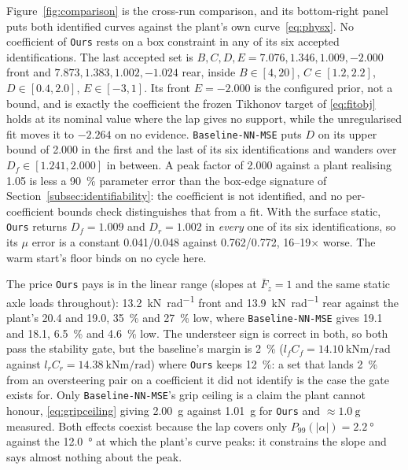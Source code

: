 Figure~\ref{fig:comparison} is the cross-run comparison, and its bottom-right
panel puts both identified curves against the plant's own
curve~\eqref{eq:physx}. No coefficient of \texttt{Ours} rests on a box
constraint in any of its six accepted identifications. The last accepted set is
$B,C,D,E=\num{7.076},\num{1.346},\num{1.009},\num{-2.000}$ front and
$\num{7.873},\num{1.383},\num{1.002},\num{-1.024}$ rear, inside
$B\in[4,20]$, $C\in[1.2,2.2]$, $D\in[0.4,2.0]$, $E\in[-3,1]$. Its front
$E=\num{-2.000}$ is the configured prior, not a bound, and is exactly the
coefficient the frozen Tikhonov target of \eqref{eq:fitobj} holds at its
nominal value where the lap gives no support, while the unregularised fit moves
it to $\num{-2.264}$ on no evidence.
\texttt{Baseline-NN-MSE} puts $D$ on its upper bound of \num{2.000} in the
first and the last of its six identifications and wanders over
$D_{f}\in[\num{1.241},\num{2.000}]$ in between. A peak factor of \num{2.000}
against a plant realising \num{1.05} is less a \SI{90}{\percent} parameter
error than the box-edge signature of Section~\ref{subsec:identifiability}: the
coefficient is not identified, and no per-coefficient bounds check
distinguishes that from a fit. With the surface static, \texttt{Ours} returns
$D_{f}=\num{1.009}$ and $D_{r}=\num{1.002}$ in \emph{every} one of its six
identifications, so its $\mu$ error is a constant \num{0.041}/\num{0.048}
against \num{0.762}/\num{0.772}, \numrange{16}{19}$\times$ worse. The warm
start's floor binds on no cycle here.

The price \texttt{Ours} pays is in the linear range (slopes at $\bar F_{z}=1$
and the same static axle loads throughout): \SI{13.2}{\kilo\newton\per\radian}
front and \SI{13.9}{\kilo\newton\per\radian} rear against the plant's
\num{20.4} and \num{19.0}, \SI{35}{\percent} and \SI{27}{\percent} low, where
\texttt{Baseline-NN-MSE} gives \num{19.1} and \num{18.1}, \SI{6.5}{\percent}
and \SI{4.6}{\percent} low. The understeer sign is correct in both, so both
pass the stability gate, but the baseline's margin is \SI{2}{\percent}
($l_{f}C_{f}=\SI{14.10}{\kilo\newton\meter\per\radian}$ against
$l_{r}C_{r}=\SI{14.38}{\kilo\newton\meter\per\radian}$) where \texttt{Ours}
keeps \SI{12}{\percent}: a set that lands \SI{2}{\percent} from an oversteering
pair on a coefficient it did not identify is the case the gate exists for.
Only \texttt{Baseline-NN-MSE}'s grip ceiling is a claim the plant cannot
honour, \eqref{eq:gripceiling} giving \SI{2.00}{\g} against \SI{1.01}{\g} for
\texttt{Ours} and $\approx\SI{1.0}{\g}$ measured. Both effects coexist because
the lap covers only $P_{99}(|\alpha|)=\SI{2.2}{\degree}$ against the
\SI{12.0}{\degree} at which the plant's curve peaks: it constrains the slope
and says almost nothing about the peak.

